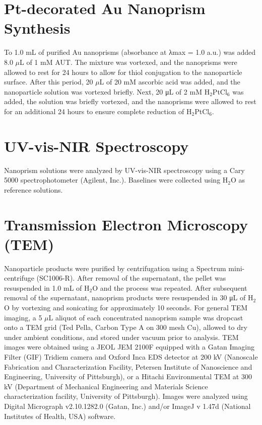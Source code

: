 \documentclass [11pt, proquest] {uwthesis}[2016/11/22]
\begin{document}
\section{Pt-decorated Au Nanoprism Synthesis}

To 1.0 mL of purified Au nanoprisms (absorbance at λmax = 1.0 a.u.) was added 8.0 $\mu$L of 1 mM AUT. The mixture was
vortexed, and the nanoprisms were allowed to rest for 24 hours to allow for thiol conjugation to the nanoparticle surface. After this period, 20 $\mu$L of 20 mM ascorbic acid was added, and the nanoparticle solution was vortexed briefly. Next, 20 μL of 2 mM H$_2$PtCl$_6$ was added, the solution was briefly vortexed, and the nanoprisms were allowed to rest for an additional 24 hours to ensure complete reduction of H$_2$PtCl$_6$. 

\section{UV-vis-NIR Spectroscopy}

Nanoprism solutions were analyzed by UV-vis-NIR spectroscopy using a Cary 5000 spectrophotometer (Agilent, Inc.). Baselines were collected using H$_2$O as reference solutions.

\section{Transmission Electron Microscopy (TEM)}

Nanoparticle products were purified by centrifugation using a Spectrum mini-centrifuge (SC1006-R). After removal of the supernatant, the pellet was resuspended in 1.0 mL of H$_2$O and the process was repeated. After subsequent removal of the supernatant, nanoprism products were resuspended in 30 μL of H$_2$O by vortexing and sonicating for approximately 10 seconds. For general TEM imaging, a 5 $\mu$L aliquot of each concentrated nanoprism sample was dropcast onto a TEM grid (Ted Pella, Carbon Type A on 300 mesh Cu), allowed to dry under ambient conditions, and stored under vacuum prior to analysis. TEM images were obtained using a JEOL JEM 2100F equipped with a Gatan Imaging Filter (GIF) Tridiem camera and Oxford Inca EDS detector at 200 kV (Nanoscale Fabrication and Characterization Facility, Petersen Institute of Nanoscience and Engineering, University of Pittsburgh), or a Hitachi Environmental TEM at 300 kV (Department of Mechanical Engineering and Materials Science characterization facility, University of Pittsburgh). Images were analyzed using Digital Micrograph v2.10.1282.0 (Gatan, Inc.) and/or ImageJ v 1.47d (National Institutes of Health, USA) software.
\end{document}
